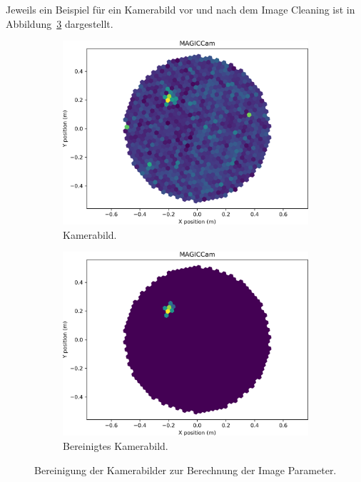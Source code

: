 Jeweils ein Beispiel für ein Kamerabild vor und nach dem Image Cleaning ist in
Abbildung~\ref{fig:cleaning} dargestellt.

\begin{figure}[htpb]
  \centering
  \begin{subfigure}[c]{0.48\linewidth}
    \includegraphics[width=\linewidth]{pictures/uncleaned.png}
    \caption{Kamerabild.}%
    \label{fig:uncleaned}
  \end{subfigure}
  \begin{subfigure}[c]{0.48\linewidth}
    \includegraphics[width=\linewidth]{pictures/cleaned.png}
    \caption{Bereinigtes Kamerabild.}%
    \label{fig:cleaned}
  \end{subfigure}
  \caption{Bereinigung der Kamerabilder zur Berechnung der Image Parameter.}%
  \label{fig:cleaning}
\end{figure}

